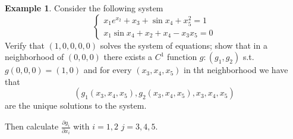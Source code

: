\documentclass[11pt,a4paper]{article}
\theoremstyle{definition}
\newtheorem{example}[definition]{Example}
\theoremstyle{plain}
\theoremstyle{remark}
\begin{document}
\begin{example}
    Consider the following system 
    $$\begin{cases}
        x_1 e^{x_2} + x_3 + \sin x_4 + x_5^2 = 1\\
        x_1 \sin x_4 + x_2 + x_4 - x_3 x_5 = 0
    \end{cases}$$
    Verify that $(1, 0,0,0,0)$ solves the system of equations; show that in a neighborhood of $(0,0,0)$ there exists a 
    $C^1$ function $g \colon (g_1, g_2)$ s.t. $g(0,0,0) = (1,0)$ and for every $(x_3, x_4, x_5)$ in tht neighborhood we have that 
    $$(g_1(x_3, x_4, x_5), g_2(x_3, x_4, x_5), x_3, x_4, x_5)$$
    are the unique solutions to the system. 

    Then calculate $\frac{\partial g_i}{\partial x_i}$ with $i = 1,2$ $j = 3,4,5$.


\end{example}
\end{document}
